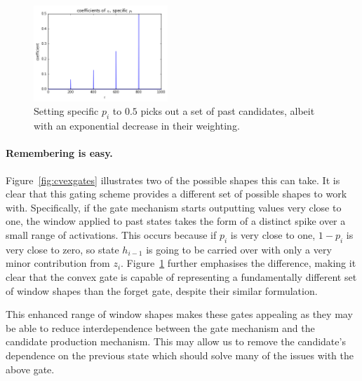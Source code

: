 \begin{figure}[tbp]
\centering
\includegraphics[width=0.45\textwidth]{newarchs/cvextrain}
\caption[Convex gate choosing several past candidates]
{Setting specific \(p_i\) to \(0.5\) picks out a set of past candidates, albeit with
an exponential decrease in their weighting.}
\label{fig:cvextrain}
\end{figure}

\paragraph{Remembering is easy.}
Figure~\ref{fig:cvexgates} illustrates two of the possible shapes this can take. It is clear
that this gating scheme provides a different set of possible shapes to work with.
Specifically, if the gate mechanism starts outputting values very close to one, the window
applied to past states takes the form of a distinct spike over a small range of activations.
This occurs because if \(p_i\) is very close to one, \(1 - p_i\) is very close to zero, so
state \(h_{i-1}\) is going to be carried over with only a very minor contribution from
\(z_i\). Figure~\ref{fig:cvextrain} further emphasises the difference, making it clear that
the convex gate is capable of representing a fundamentally different set of window shapes
than the forget gate, despite their similar formulation.

This enhanced range of window shapes makes these gates appealing as they may be able to reduce
interdependence between the gate mechanism and the candidate production mechanism. This may
allow us to remove the candidate's dependence on the previous state which should solve many of the
issues with the above gate.

